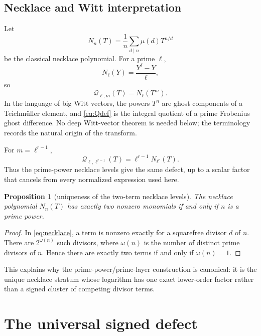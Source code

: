 \documentclass[11pt]{article}
\numberwithin{equation}{section}
\newtheorem{proposition}[theorem]{Proposition}
\theoremstyle{definition}
\theoremstyle{remark}
\begin{document}
\subsection{Necklace and Witt interpretation}

Let
\begin{equation}\label{eq:necklace}
  N_n(T)=\frac1n\sum_{d\mid n}\mu(d)T^{n/d}
\end{equation}
be the classical necklace polynomial.  For a prime $\ell$,
\[
  N_\ell(Y)=\frac{Y^\ell-Y}{\ell},
\]
so
\begin{equation}\label{eq:Qnecklace}
  \mathcal Q_{\ell,m}(T)=N_\ell(T^m).
\end{equation}
In the language of big Witt vectors, the powers $T^n$ are ghost components of a Teichm\"uller element, and \eqref{eq:Qdef} is the integral quotient of a prime Frobenius ghost difference.  No deep Witt-vector theorem is needed below; the terminology records the natural origin of the transform.

For $m=\ell^{r-1}$,
\begin{equation}\label{eq:primepowernecklace}
  \mathcal Q_{\ell,\ell^{r-1}}(T)
  =\ell^{r-1}N_{\ell^r}(T).
\end{equation}
Thus the prime-power necklace levels give the same defect, up to a scalar factor that cancels from every normalized expression used here.

\begin{proposition}[uniqueness of the two-term necklace levels]\label{prop:two-term}
The necklace polynomial $N_n(T)$ has exactly two nonzero monomials if and only if $n$ is a prime power.
\end{proposition}

\begin{proof}
In \eqref{eq:necklace}, a term is nonzero exactly for a squarefree divisor $d$ of $n$.  There are $2^{\omega(n)}$ such divisors, where $\omega(n)$ is the number of distinct prime divisors of $n$.  Hence there are exactly two terms if and only if $\omega(n)=1$.
\end{proof}

This explains why the prime-power/prime-layer construction is canonical: it is the unique necklace stratum whose logarithm has one exact lower-order factor rather than a signed cluster of competing divisor terms.

\section{The universal signed defect}
\end{document}
